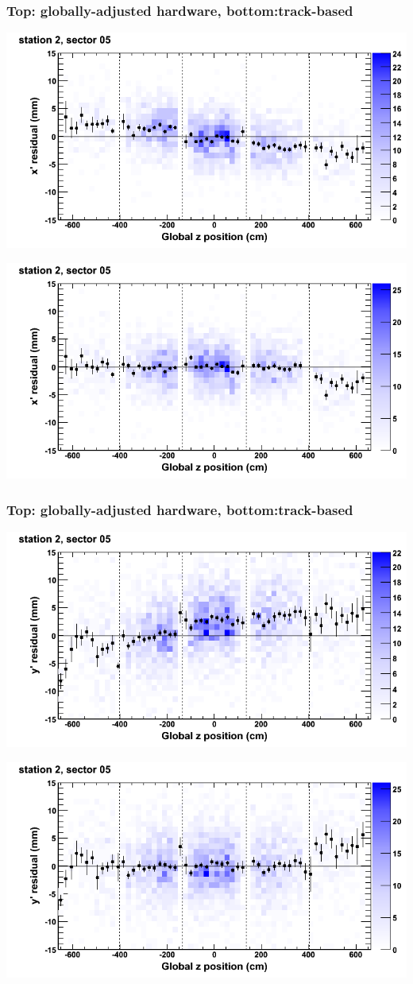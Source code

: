 \documentclass[compress]{beamer}
\begin{document}
\begin{frame}
\frametitle{Top: globally-adjusted hardware, bottom:track-based}
\includegraphics[width=0.7\linewidth]{NOV4_mapplots_HW/DTvsz_st2sec05_x.png}

\includegraphics[width=0.7\linewidth]{NOV4_mapplots/DTvsz_st2sec05_x.png}
\end{frame}

\begin{frame}
\frametitle{Top: globally-adjusted hardware, bottom:track-based}
\includegraphics[width=0.7\linewidth]{NOV4_mapplots_HW/DTvsz_st2sec05_y.png}

\includegraphics[width=0.7\linewidth]{NOV4_mapplots/DTvsz_st2sec05_y.png}
\end{frame}
\end{document}
